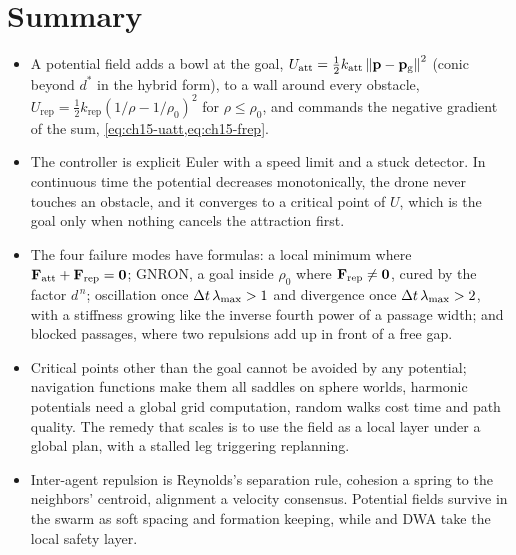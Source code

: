 \section{Summary}
\begin{summary}
\begin{itemize}
  \item A potential field adds a bowl at the goal, $U_{\mathrm{att}} = \tfrac12 k_{\mathrm{att}} \left\lVert \mathbf{p} - \mathbf{p}_{\mathrm{g}} \right\rVert^2$ (conic beyond $d^*$ in the hybrid form), to a wall around every obstacle, $U_{\mathrm{rep}} = \tfrac12 k_{\mathrm{rep}} (1/\rho - 1/\rho_0)^2$ for $\rho \le \rho_0$, and commands the negative gradient of the sum, \cref{eq:ch15-uatt,eq:ch15-frep}.
  \item The controller is explicit Euler with a speed limit and a stuck detector. In continuous time the potential decreases monotonically, the drone never touches an obstacle, and it converges to a critical point of $U$, which is the goal only when nothing cancels the attraction first.
  \item The four failure modes have formulas: a local minimum where $\mathbf{F}_{\mathrm{att}} + \mathbf{F}_{\mathrm{rep}} = \mathbf{0}$; GNRON, a goal inside $\rho_0$ where $\mathbf{F}_{\mathrm{rep}} \ne \mathbf{0}$, cured by the factor $d^{\,n}$; oscillation once $\Delta t\,\lambda_{\max} > 1$ and divergence once $\Delta t\,\lambda_{\max} > 2$, with a stiffness growing like the inverse fourth power of a passage width; and blocked passages, where two repulsions add up in front of a free gap.
  \item Critical points other than the goal cannot be avoided by any potential; navigation functions make them all saddles on sphere worlds, harmonic potentials need a global grid computation, random walks cost time and path quality. The remedy that scales is to use the field as a local layer under a global plan, with a stalled leg triggering replanning.
  \item Inter-agent repulsion is Reynolds's separation rule, cohesion a spring to the neighbors' centroid, alignment a velocity consensus. Potential fields survive in the swarm as soft spacing and formation keeping, while \orca and DWA take the local safety layer.
\end{itemize}
\end{summary}

